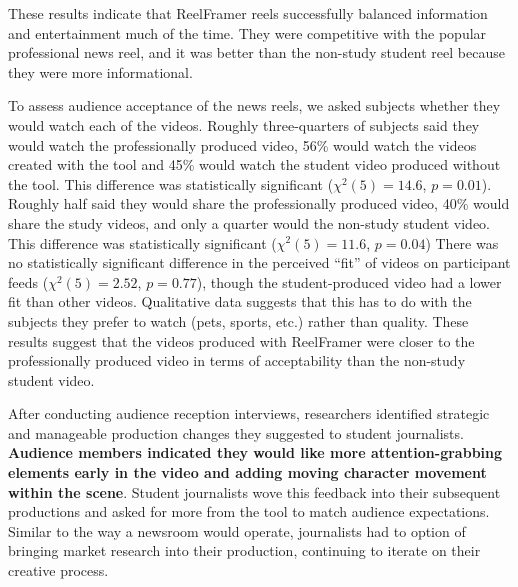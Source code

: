 These results indicate that  ReelFramer reels  successfully balanced information and entertainment much of the time. 
They were competitive with the popular professional news reel, and it was better than the non-study student reel because they were more informational. 


To assess audience acceptance of the news reels, we asked subjects whether they would watch each of the videos. 
Roughly three-quarters of subjects said they would watch the professionally produced video,  56\% would watch the videos created with the tool and 45\% would watch the student video produced without the tool. 
This difference was statistically significant ($\chi^2(5)=14.6$, $p=0.01$).
Roughly half said they would share the professionally produced video,  40\% would share the study videos, and only  a quarter would the non-study student video. 
This difference was statistically significant ($\chi^2(5)=11.6$, $p=0.04$)
There was no statistically significant difference in the perceived ``fit'' of videos on participant feeds ($\chi^2(5)=2.52$, $p=0.77$), though the student-produced video had a lower fit than other videos.
Qualitative data suggests that this has to do with the subjects they prefer to watch (pets, sports, etc.) rather than quality. 
These results suggest that the videos produced with ReelFramer were closer to the professionally produced video in terms of acceptability than the non-study student video. 

After conducting audience reception interviews, researchers identified strategic and manageable production changes they suggested to student journalists. 
\textbf{Audience members indicated they would like more attention-grabbing elements early in the video and adding moving character movement within the scene}. 
Student journalists wove this feedback into their subsequent productions and asked for more from the tool to match audience expectations. 
Similar to the way a newsroom would operate, journalists had to option of bringing market research into their production, continuing to iterate on their creative process. 